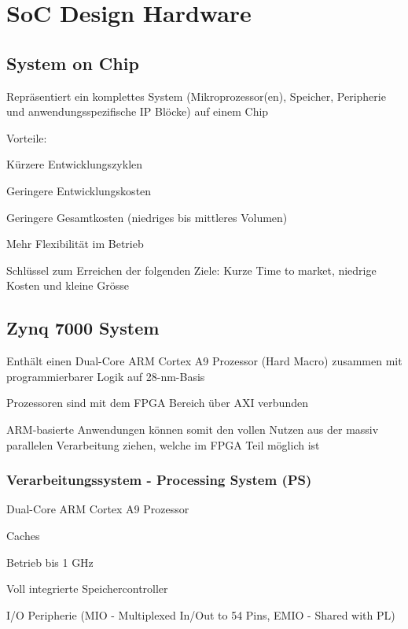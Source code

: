 \section{SoC Design Hardware}
\subsection{System on Chip}
\begin{compactitem}
    \item Repräsentiert ein komplettes System (Mikroprozessor(en), Speicher, Peripherie und anwendungsspezifische IP Blöcke) auf einem Chip
    \item Vorteile:
        \begin{compactitem}
            \item Kürzere Entwicklungszyklen
            \item Geringere Entwicklungskosten
            \item Geringere Gesamtkosten (niedriges bis mittleres Volumen)
            \item Mehr Flexibilität im Betrieb
        \end{compactitem}
    \item Schlüssel zum Erreichen der folgenden Ziele: Kurze Time to market, niedrige Kosten und kleine Grösse
\end{compactitem}
\begin{multicols}{2}
    \subsection{Zynq 7000 System}
    \begin{compactitem}
        \item Enthält einen Dual-Core ARM Cortex A9 Prozessor (Hard Macro) zusammen mit programmierbarer Logik auf 28-nm-Basis
        \item Prozessoren sind mit dem FPGA Bereich über AXI verbunden
        \item ARM-basierte Anwendungen können somit den vollen Nutzen aus der massiv parallelen Verarbeitung ziehen, welche im FPGA Teil möglich ist
    \end{compactitem}
    \subsubsection{Verarbeitungssystem - Processing System (PS)}
    \begin{compactitem}
        \item Dual-Core ARM Cortex A9 Prozessor
        \item Caches
        \item Betrieb bis 1 GHz
        \item Voll integrierte Speichercontroller
        \item I/O Peripherie (MIO - Multiplexed In/Out to 54 Pins, EMIO - Shared with PL)
    \end{compactitem}
\end{multicols}
